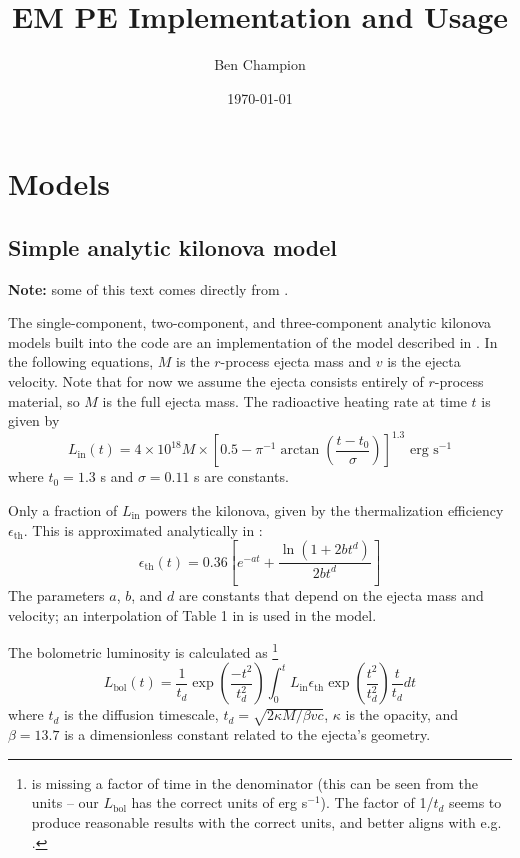 \documentclass{article}
\begin{document}
\title{EM PE Implementation and Usage}

%
\author{Ben Champion}

\date{\today}

\maketitle

\section{Models}

\subsection{Simple analytic kilonova model}

\textbf{Note:} some of this text comes directly from \cite{Villar_2017}.

The single-component, two-component, and three-component analytic kilonova models built into the code are an implementation of the model described in \cite{Villar_2017}.
In the following equations, $M$ is the $r$-process ejecta mass and $v$ is the ejecta velocity.
Note that for now we assume the ejecta consists entirely of $r$-process material, so $M$ is the full ejecta mass.
The radioactive heating rate at time $t$ is given by \cite{Korobkin_2012}
\begin{equation}
    L_\text{in}(t) = 4 \times 10^{18} M \times \left [ 0.5 - \pi^{-1} \arctan \left ( \frac {t - t_0} {\sigma} \right ) \right ]^{1.3} \text{ erg s}^{-1}
\end{equation}
where $t_0 = 1.3$ s and $\sigma = 0.11$ s are constants.

Only a fraction of $L_\text{in}$ powers the kilonova, given by the thermalization efficiency $\epsilon_\text{th}$.
This is approximated analytically in \cite{Barnes_2016}:
\begin{equation}
    \epsilon_\text{th}(t) = 0.36 \left [ e^{-a t} + \frac {\ln(1 + 2 b t^d)} {2 b t^d} \right ]
\end{equation}
The parameters $a$, $b$, and $d$ are constants that depend on the ejecta mass and velocity; an interpolation of Table 1 in \cite{Barnes_2016} is used in the model.

The bolometric luminosity is calculated as
\footnote{\cite{Villar_2017} is missing a factor of time in the denominator (this can be seen from the units -- our $L_\text{bol}$ has the correct units of erg s$^{-1}$). 
The factor of 1/$t_d$ seems to produce reasonable results with the correct units, and better aligns with e.g. \cite{Chatzopoulos_2012}.}
\begin{equation}
    L_\text{bol}(t) = \frac {1} {t_d} \exp{\left ( \frac {-t^2} {t_d^2} \right ) }
                    \int_0^t L_\text{in} \epsilon_\text{th} \exp{\left ( \frac {t^2} {t_d^2} \right ) } \frac {t} {t_d} dt
\end{equation}
where $t_d$ is the diffusion timescale, $t_d = \sqrt{2 \kappa M / \beta v c}$, $\kappa$ is the opacity, and $\beta = 13.7$ is a dimensionless constant related to the ejecta's geometry.
\end{document}
